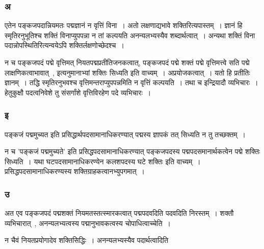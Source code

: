 			\subsubsection{अ}
			
				\begin{small}
				
					एतेन पङ्कजपदान्नियमतः पद्मज्ञानं न वृत्तिं विना~। अतो लक्षणाद्यभावे शक्तिरित्यपास्तम्~। ज्ञानं हि स्मृतिरनुभूतिश्च शक्तिं विनाप्युपपन्ना न तां कल्पयति अनन्यलभ्यस्यैव शब्दार्थत्वात्~। अन्यथा शक्तिं विना पदान्नोपस्थितिरित्यन्वयेऽपि शक्तिर्लक्षणोच्छेदश्च~। 
				\end{small}
					
					न च पङ्कजपदं पद्मे वृत्तिमत् नियतपद्मप्रतीतिजनकत्वात्, पङ्कजपदं  पद्मे शक्तं पद्मे वृत्तिमत्त्वे सति पद्मे लाक्षणिकत्वाभावात्~, इत्यनुमानाभ्यां शक्तिः सिध्यति इति वाच्यम्~। अप्रयोजकत्वात्~।  यतो हि प्रतीतिः ज्ञानम्~।  तद्धि स्मृतिरनुभवश्च वृत्तिमन्तराप्युपपन्नमिति  न वृत्तिं कल्पयति~।  तथा च इन्द्रियादौ व्यभिचारः~। हेतुकुक्षौ  पदत्वनिवेशे तु संसर्गांशे वृत्तिविरहेण पदे व्यभिचारः~।

			\subsubsection{इ}
			
				\begin{small}
				
					पङ्कजं पद्ममुच्यत इति प्रसिद्धार्थपदसामानाधिकरण्यात् पद्मस्य ज्ञापकं तत् सिध्यति न तु तच्छक्तम्~। 
				\end{small}
			
				 न च ’पङ्कजं पद्ममुच्यते’  इति प्रसिद्धपदसामानाधिकरण्यात् पङ्कजपदस्य पद्मपदसमानार्थकत्वेन  पद्मे शक्तिः सिध्यति~। यथा घटपदसामानाधिकरण्येन कलशपदस्य घटे शक्तिः इति वाच्यम्~। प्रसिद्धपदसामानाधिकरण्यस्य शक्तिग्राहकत्वानभ्युपगमात्~। 

			\subsubsection{उ}
			
				\begin{small}
				
					अत एव पङ्कजपदं पद्मशक्तं नियमतस्तत्स्मारकत्वात् पद्मपदवदिति पदवदिति निरस्तम्~। शक्तौ व्यभिचारात्~, अनन्यलभ्यत्वस्य पद्मानुभावकत्वस्य चोपाधित्वाच्चेति~। 
				
					न चैवं नियतप्रयोगादेव शक्तिसिद्धिः~। अनन्यलभ्यस्यैव पदार्थत्वादिति
				\end{small}
			
